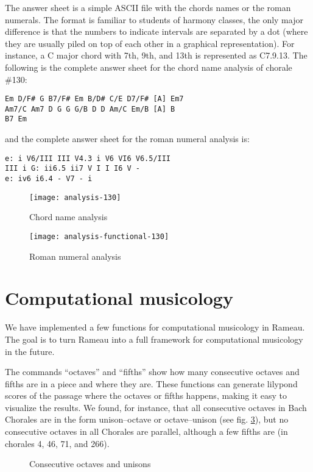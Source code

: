 The answer sheet is a simple ASCII file with the chords names or the
roman numerals. The format is familiar to students of harmony classes,
the only major difference is that the numbers to indicate intervals
are separated by a dot (where they are usually piled on top of each
other in a graphical representation). For instance, a C major chord
with 7th, 9th, and 13th is represented as C7.9.13. The following is
the complete answer sheet for the chord name analysis of chorale
\#130:
\begin{verbatim}
Em D/F# G B7/F# Em B/D# C/E D7/F# [A] Em7
Am7/C Am7 D G G G/B D D Am/C Em/B [A] B 
B7 Em
\end{verbatim}
and the complete answer sheet for the roman numeral analysis is:
\begin{verbatim}
e: i V6/III III V4.3 i V6 VI6 V6.5/III
III i G: ii6.5 ii7 V I I I6 V -
e: iv6 i6.4 - V7 - i
\end{verbatim}

\begin{figure}
  \centering
  \texttt{[image: analysis-130]}
  \caption{Chord name analysis}
  \label{fig:chord-name-analysis}
\end{figure}
\begin{figure}
  \centering
  \texttt{[image: analysis-functional-130]}  
  \caption{Roman numeral analysis}
  \label{fig:roman-analysis}
\end{figure}


\section{Computational musicology}
\label{sec:comp-music}

We have implemented a few functions for computational musicology in
Rameau. The goal is to turn Rameau into a full framework for
computational musicology in the future.

The commands ``octaves'' and ``fifths'' show how many consecutive
octaves and fifths are in a piece and where they are. These functions
can generate lilypond scores of the passage where the octaves or
fifths happens, making it easy to visualize the results. We found, for
instance, that all consecutive octaves in Bach Chorales are in the
form unison--octave or octave--unison (see fig.
\ref{fig:oitavas-e-unissonos}), but no consecutive octaves in all
Chorales are parallel, although a few fifths are (in chorales 4, 46,
71, and 266).

\begin{figure}[!h]
  \centering
  \qquad
  \qquad
  \caption{Consecutive octaves and unisons}
  \label{fig:oitavas-e-unissonos}
\end{figure}

